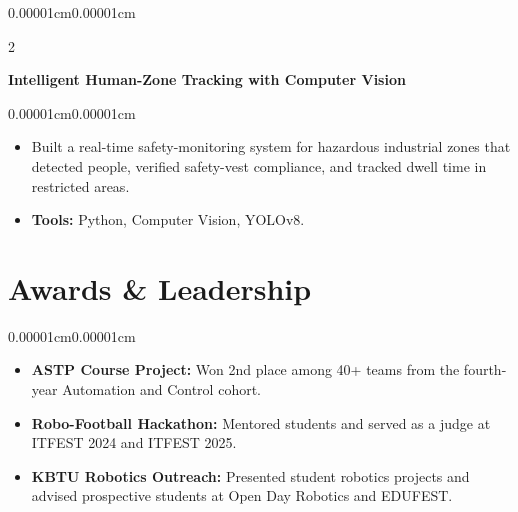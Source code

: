 \documentclass[10pt, a4paper]{article}
\newenvironment{highlights}{
    \begin{itemize}[
        topsep=0.10cm,
        parsep=0.06cm,
        partopsep=0pt,
        itemsep=0pt,
        leftmargin=10pt
    ]
}{
    \end{itemize}
}
\newenvironment{onecolentry}{
    \begin{adjustwidth}{0.00001cm}{0.00001cm}
}{
    \end{adjustwidth}
}
\newenvironment{twocolentry}[2][]{
    \onecolentry
    \def\secondColumn{#2}
    \setcolumnwidth{\fill, 4.5cm}
    \begin{paracol}{2}
}{
    \switchcolumn
    \raggedleft
    \secondColumn
    \end{paracol}
    \endonecolentry
}
\begin{document}
        \begin{twocolentry}{}
            \textbf{Intelligent Human-Zone Tracking with Computer Vision}
        \end{twocolentry}
        \vspace{0.10cm}

        \begin{onecolentry}
            \begin{highlights}
                \item Built a real-time safety-monitoring system for hazardous industrial zones that detected people, verified safety-vest compliance, and tracked dwell time in restricted areas.
                \item \textbf{Tools:} Python, Computer Vision, YOLOv8.
            \end{highlights}
        \end{onecolentry}

    \section{Awards \& Leadership}

        \begin{onecolentry}
            \begin{highlights}
                \item \textbf{ASTP Course Project:} Won 2nd place among 40+ teams from the fourth-year Automation and Control cohort.
                \item \textbf{Robo-Football Hackathon:} Mentored students and served as a judge at ITFEST 2024 and ITFEST 2025.
                \item \textbf{KBTU Robotics Outreach:} Presented student robotics projects and advised prospective students at Open Day Robotics and EDUFEST.
            \end{highlights}
        \end{onecolentry}
\end{document}
